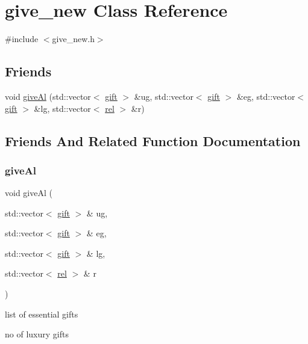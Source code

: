 \hypertarget{classgive__new}{}\section{give\+\_\+new Class Reference}
\label{classgive__new}


{\ttfamily \#include $<$give\+\_\+new.\+h$>$}

\subsection*{Friends}
\begin{DoxyCompactItemize}
\item 
void \hyperlink{classgive__new_a218ad00cb368ca7fdbe9d2201e9920bc}{give\+Al} (std\+::vector$<$ \hyperlink{classgift}{gift} $>$ \&ug, std\+::vector$<$ \hyperlink{classgift}{gift} $>$ \&eg, std\+::vector$<$ \hyperlink{classgift}{gift} $>$ \&lg, std\+::vector$<$ \hyperlink{classrel}{rel} $>$ \&r)
\end{DoxyCompactItemize}


\subsection{Friends And Related Function Documentation}
\mbox{\label{classgive__new_a218ad00cb368ca7fdbe9d2201e9920bc}} 
\subsubsection{\texorpdfstring{give\+Al}{giveAl}}
{\footnotesize\ttfamily void give\+Al (\begin{DoxyParamCaption}\item[{std\+::vector$<$ \hyperlink{classgift}{gift} $>$ \&}]{ug,  }\item[{std\+::vector$<$ \hyperlink{classgift}{gift} $>$ \&}]{eg,  }\item[{std\+::vector$<$ \hyperlink{classgift}{gift} $>$ \&}]{lg,  }\item[{std\+::vector$<$ \hyperlink{classrel}{rel} $>$ \&}]{r }\end{DoxyParamCaption})\hspace{0.3cm}{\ttfamily [friend]}}

list of essential gifts

no of luxury gifts

